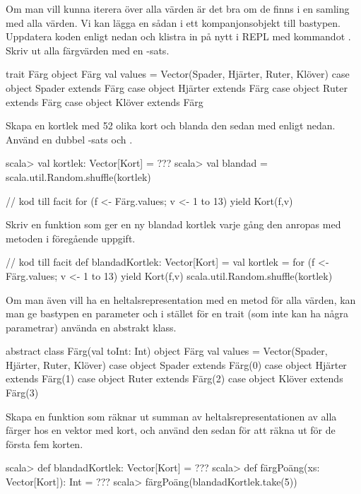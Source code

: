 \Subtask Om man vill kunna iterera över alla värden är det bra om de finns i en samling med alla värden. Vi kan lägga en sådan i ett kompanjonsobjekt till bastypen. Uppdatera koden enligt nedan och klistra in på nytt i REPL med kommandot . Skriv ut alla färgvärden med en -sats.

\begin{Code}
trait Färg
object Färg { 
  val values = Vector(Spader, Hjärter, Ruter, Klöver)
}
case object Spader extends Färg
case object Hjärter extends Färg
case object Ruter extends Färg
case object Klöver extends Färg
\end{Code}
Skapa en kortlek med 52 olika kort och blanda den sedan med  enligt nedan. Använd en dubbel -sats och .
\begin{REPL}
scala> val kortlek: Vector[Kort] = ???
scala> val blandad = scala.util.Random.shuffle(kortlek)
\end{REPL}

\begin{Code}
// kod till facit
for (f <- Färg.values; v <- 1 to 13) yield Kort(f,v)
\end{Code}

\Subtask Skriv en funktion  som ger en ny blandad kortlek varje gång den anropas med metoden i föregående uppgift.
\begin{Code}
// kod till facit
def blandadKortlek: Vector[Kort] = {
  val kortlek = 
    for (f <- Färg.values; v <- 1 to 13) yield Kort(f,v)
  scala.util.Random.shuffle(kortlek)
}
\end{Code}



\Subtask Om man även vill ha en heltalsrepresentation med en metod  för alla värden, kan man ge bastypen en parameter och i stället för en trait (som inte kan ha några parametrar) använda en abstrakt klass.

\begin{Code}
abstract class Färg(val toInt: Int)
object Färg { 
  val values = Vector(Spader, Hjärter, Ruter, Klöver)
}
case object Spader  extends Färg(0)
case object Hjärter extends Färg(1)
case object Ruter   extends Färg(2)
case object Klöver  extends Färg(3)
\end{Code}
Skapa en funktion  som räknar ut summan av heltalsrepresentationen av alla färger hos en vektor med kort, och använd den sedan för att räkna ut  för de första fem korten.
\begin{REPL}
scala> def blandadKortlek: Vector[Kort] = ???
scala> def färgPoäng(xs: Vector[Kort]): Int = ???
scala> färgPoäng(blandadKortlek.take(5))
\end{REPL}

